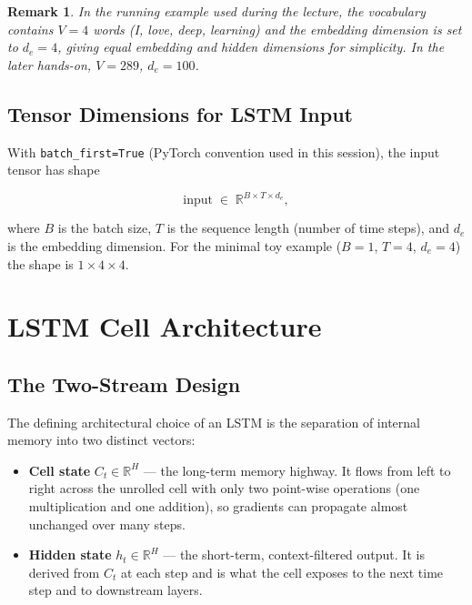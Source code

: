 \documentclass[12pt,a4paper]{article}
\newtheorem{remark}{Remark}[section]
\newcommand{\R}{\mathbb{R}}
\begin{document}
\begin{remark}
  In the running example used during the lecture, the vocabulary contains
  $V = 4$ words (\emph{I}, \emph{love}, \emph{deep}, \emph{learning}) and the
  embedding dimension is set to $d_e = 4$, giving equal embedding and hidden
  dimensions for simplicity.  In the later hands-on, $V = 289$, $d_e = 100$.
\end{remark}

\subsection{Tensor Dimensions for LSTM Input}
\label{subsec:tensor-dims}

With \texttt{batch\_first=True} (PyTorch convention used in this session),
the input tensor has shape

\[
  \text{input} \;\in\; \R^{B \times T \times d_e},
\]

where $B$ is the batch size, $T$ is the sequence length (number of time steps),
and $d_e$ is the embedding dimension.  For the minimal toy example
($B=1$, $T=4$, $d_e=4$) the shape is $1 \times 4 \times 4$.

\section{LSTM Cell Architecture}
\label{sec:lstm-arch}

\subsection{The Two-Stream Design}
\label{subsec:two-stream}

The defining architectural choice of an LSTM is the separation of internal
memory into two distinct vectors:

\begin{itemize}
  \item \textbf{Cell state} $C_t \in \R^H$ --- the long-term memory highway.
    It flows from left to right across the unrolled cell with only two
    point-wise operations (one multiplication and one addition), so gradients
    can propagate almost unchanged over many steps.
  \item \textbf{Hidden state} $h_t \in \R^H$ --- the short-term, context-filtered
    output.  It is derived from $C_t$ at each step and is what the cell exposes
    to the next time step and to downstream layers.
\end{itemize}
\end{document}
